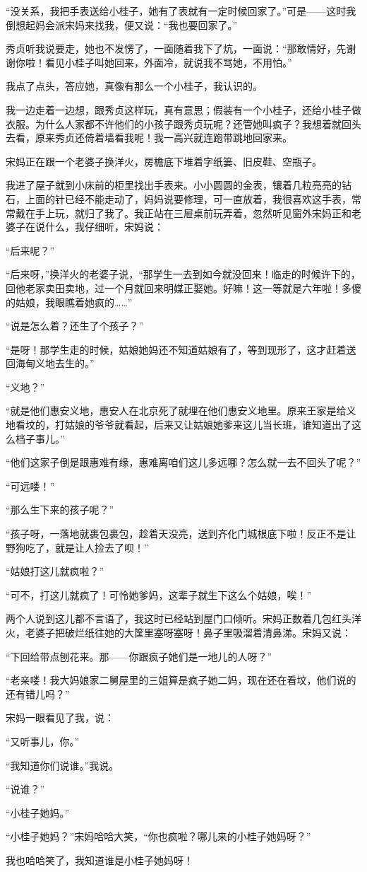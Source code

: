 \par “没关系，我把手表送给小桂子，她有了表就有一定时候回家了。”可是——这时我倒想起妈会派宋妈来找我，便又说：“我也要回家了。”
\par 秀贞听我说要走，她也不发愣了，一面随着我下了炕，一面说：“那敢情好，先谢谢你啦！看见小桂子叫她回来，外面冷，就说我不骂她，不用怕。”
\par 我点了点头，答应她，真像有那么一个小桂子，我认识的。
\par 我一边走着一边想，跟秀贞这样玩，真有意思；假装有一个小桂子，还给小桂子做衣服。为什么人家都不许他们的小孩子跟秀贞玩呢？还管她叫疯子？我想着就回头去看，原来秀贞还倚着墙看我呢！我一高兴就连跑带跳地回家来。
\par 宋妈正在跟一个老婆子换洋火，房檐底下堆着字纸篓、旧皮鞋、空瓶子。
\par 我进了屋子就到小床前的柜里找出手表来。小小圆圆的金表，镶着几粒亮亮的钻石，上面的针已经不能走动了，妈妈说要修理，可一直放着，我很喜欢这手表，常常戴在手上玩，就归了我了。我正站在三屉桌前玩弄着，忽然听见窗外宋妈正和老婆子在说什么，我仔细听，宋妈说：
\par “后来呢？”
\par “后来呀，”换洋火的老婆子说，“那学生一去到如今就没回来！临走的时候许下的，回他老家卖田卖地，过一个月就回来明媒正娶她。好嘛！这一等就是六年啦！多傻的姑娘，我眼瞧着她疯的……”
\par “说是怎么着？还生了个孩子？”
\par “是呀！那学生走的时候，姑娘她妈还不知道姑娘有了，等到现形了，这才赶着送回海甸义地去生的。”
\par “义地？”
\par “就是他们惠安义地，惠安人在北京死了就埋在他们惠安义地里。原来王家是给义地看坟的，打姑娘的爷爷就看起，后来又让姑娘她爹来这儿当长班，谁知道出了这么档子事儿。”
\par “他们这家子倒是跟惠难有缘，惠难离咱们这儿多远哪？怎么就一去不回头了呢？”
\par “可远喽！”
\par “那么生下来的孩子呢？”
\par “孩子呀，一落地就裹包裹包，趁着天没亮，送到齐化门城根底下啦！反正不是让野狗吃了，就是让人捡去了呗！”
\par “姑娘打这儿就疯啦？”
\par “可不，打这儿就疯了！可怜她爹妈，这辈子就生下这么个姑娘，唉！”
\par 两个人说到这儿都不言语了，我这时已经站到屋门口倾听。宋妈正数着几包红头洋火，老婆子把破烂纸往她的大筐里塞呀塞呀！鼻子里吸溜着清鼻涕。宋妈又说：
\par “下回给带点刨花来。那——你跟疯子她们是一地儿的人呀？”
\par “老亲喽！我大妈娘家二舅屋里的三姐算是疯子她二妈，现在还在看坟，他们说的还有错儿吗？”
\par 宋妈一眼看见了我，说：
\par “又听事儿，你。”
\par “我知道你们说谁。”我说。
\par “说谁？”
\par “小桂子她妈。”
\par “小桂子她妈？”宋妈哈哈大笑，“你也疯啦？哪儿来的小桂子她妈呀？”
\par 我也哈哈笑了，我知道谁是小桂子她妈呀！

